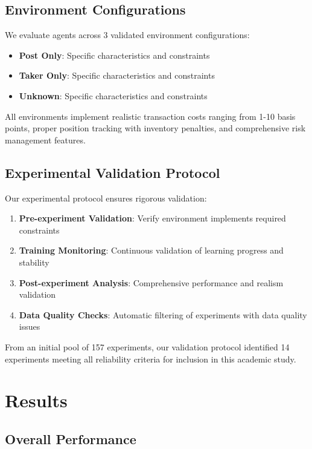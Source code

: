 \documentclass[11pt,a4paper]{article}
\begin{document}
\subsection{Environment Configurations}

We evaluate agents across 3 validated environment configurations:
\begin{itemize}
\item \textbf{Post Only}: Specific characteristics and constraints
\item \textbf{Taker Only}: Specific characteristics and constraints
\item \textbf{Unknown}: Specific characteristics and constraints
\end{itemize}

All environments implement realistic transaction costs ranging from 1-10 basis points, proper position tracking with inventory penalties, and comprehensive risk management features.

\subsection{Experimental Validation Protocol}

Our experimental protocol ensures rigorous validation:

\begin{enumerate}
\item \textbf{Pre-experiment Validation}: Verify environment implements required constraints
\item \textbf{Training Monitoring}: Continuous validation of learning progress and stability
\item \textbf{Post-experiment Analysis}: Comprehensive performance and realism validation
\item \textbf{Data Quality Checks}: Automatic filtering of experiments with data quality issues
\end{enumerate}

From an initial pool of 157 experiments, our validation protocol identified 14 experiments meeting all reliability criteria for inclusion in this academic study.

\section{Results}
\label{sec:results}

\subsection{Overall Performance}
\end{document}

